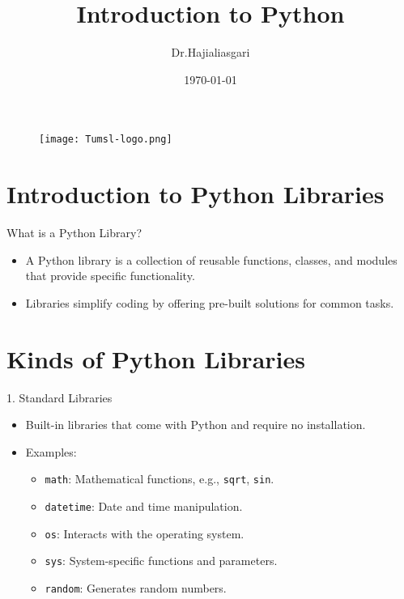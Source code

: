 \documentclass[serif, aspectratio=169]{beamer}
\author{Dr.Hajialiasgari}
\title{Introduction to Python}
\institute{
    Tehran University \\
    Of\\
    Medical Science
}
\date{\small \today}
\begin{document}
\begin{frame}
    \titlepage
    \vspace*{-0.6cm}
    \begin{figure}[htpb]
        \begin{center}
            \texttt{[image: Tumsl-logo.png]}
        \end{center}
    \end{figure}
\end{frame}

\begin{frame}    
\tableofcontents[sectionstyle=show, subsectionstyle=show/shaded/hide, subsubsectionstyle=show/shaded/hide]
\end{frame}

\section{Introduction to Python Libraries}

\begin{frame}{What is a Python Library?}
    \begin{itemize}
        \item A Python library is a collection of reusable functions, classes, and modules that provide specific functionality.
        \item Libraries simplify coding by offering pre-built solutions for common tasks.
    \end{itemize}
\end{frame}

\section{Kinds of Python Libraries}

\begin{frame}{1. Standard Libraries}
    \begin{itemize}
        \item Built-in libraries that come with Python and require no installation.
        \item Examples:
        \begin{itemize}
            \item \texttt{math}: Mathematical functions, e.g., \texttt{sqrt}, \texttt{sin}.
            \item \texttt{datetime}: Date and time manipulation.
            \item \texttt{os}: Interacts with the operating system.
            \item \texttt{sys}: System-specific functions and parameters.
            \item \texttt{random}: Generates random numbers.
        \end{itemize}
    \end{itemize}
\end{frame}
\end{document}
